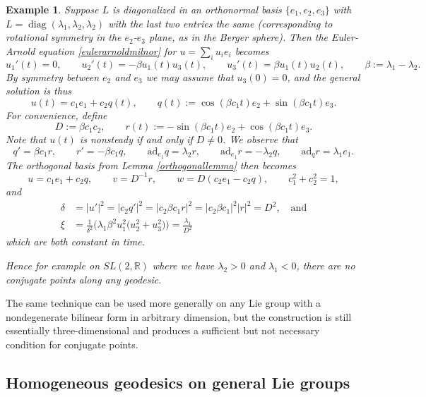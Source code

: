 \documentclass[oneside, 11pt]{amsart}
\newtheorem{example}[theorem]{Example}
\numberwithin{equation}{section}
\DeclareMathOperator{\diag}{diag}
\newcommand{\ad}{\mathrm{ad}}
\newcommand{\consty}{D}
\begin{document}
\begin{example}\label{sl2-example}
Suppose $L$ is diagonalized in an orthonormal basis $\{e_1,e_2,e_3\}$ with $L=\diag(\lambda_1,\lambda_2,\lambda_2)$ with the last two entries the same (corresponding to rotational symmetry in the $e_2$-$e_3$ plane, as in the Berger sphere). Then the Euler-Arnold equation \eqref{eulerarnoldmilnor} for $u = \sum_i u_ie_i$ becomes 
$$ u_1'(t) = 0, \qquad u_2'(t) = -\beta u_1(t)u_3(t), \qquad u_3'(t) = \beta u_1(t)u_2(t), \qquad \beta:=\lambda_1-\lambda_2.$$
By symmetry between $e_2$ and $e_3$ we may assume that $u_3(0)=0$, and the general solution is thus 
$$ u(t) = c_1 e_1 + c_2 q(t), \qquad q(t):=\cos{(\beta c_1 t)}e_2 + \sin{(\beta c_1 t)}e_3.$$
For convenience, define 
$$ \consty:=\beta c_1 c_2, \qquad r(t):= -\sin{(\beta c_1 t)}e_2 + \cos{(\beta c_1 t)} e_3.$$
Note that $u(t)$ is nonsteady if and only if $\consty \ne 0$.
We observe that 
$$ q' = \beta c_1 r, \qquad r' = -\beta c_1 q, \qquad \ad_{e_1}q = \lambda_2 r, \qquad \ad_{e_1}r = -\lambda_2 q, \qquad \ad_qr = \lambda_1 e_1.$$
The orthogonal basis from Lemma \ref{orthogonallemma} then becomes 
$$ u = c_1 e_1 + c_2 q, \qquad 
v = \consty^{-1} r, \qquad w = \consty (c_2e_1 - c_2q), \qquad c_1^2+c_2^2=1, $$
and
\begin{align*}
\delta &= |u'|^2 = |c_2q'|^2 = |c_2 \beta c_1 r|^2 = |c_2 \beta c_1|^2 |r|^2 = D^2, \quad \text{and} \\ 
\xi &= \frac{1}{\delta^2}\Big(\lambda_1 \beta^2 u_1^2\big(u_2^2 + u_3^2\big)\Big) = \frac{\lambda_1}{D^2}
\end{align*}
which are both constant in time. 
 


 Hence for example on $SL(2,\mathbb{R})$ where we have $\lambda_2>0$ and $\lambda_1<0$, there are no conjugate points along any geodesic. 
 
 \end{example} 
 
 

The same technique can be used more generally on any 
Lie group with a nondegenerate bilinear form in arbitrary dimension, but the construction is still essentially three-dimensional and produces a sufficient but not necessary condition for conjugate points. 
 
 
 
  
 
 

  
   

 

\subsection{Homogeneous geodesics on general Lie groups}\label{steadygeneral}
\end{document}
